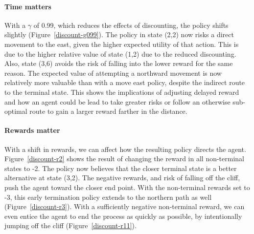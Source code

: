 \documentclass{sig-alternate}
\begin{document}
\paragraph{Time matters}

With a $\gamma$ of 0.99, which reduces the effects of discounting, the policy shifts slightly (Figure~\ref{discount-g099}). The policy in state (2,2) now risks a direct movement to the east, given the higher expected utility of that action. This is due to the higher relative value of state (1,2) due to the reduced discounting. Also, state (3,6) avoids the risk of falling into the lower reward for the same reason. The expected value of attempting a northward movement is now relatively more valuable than with a move east policy, despite the indirect route to the terminal state. This shows the implications of adjusting delayed reward and how an agent could be lead to take greater risks or follow an otherwise sub-optimal route to gain a larger reward farther in the distance.

\paragraph{Rewards matter}

With a shift in rewards, we can affect how the resulting policy directs the agent. Figure~\ref{discount-r2} shows the result of changing the reward in all non-terminal states to -2. The policy now believes that the closer terminal state is a better alternative at state (3,2). The negative rewards, and risk of falling off the cliff, push the agent toward the closer end point. With the non-terminal rewards set to -3, this early termination policy extends to the northern path as well (Figure~\ref{discount-r3}). With a sufficiently negative non-terminal reward, we can even entice the agent to end the process as quickly as possible, by intentionally jumping off the cliff (Figure~\ref{discount-r11}).
\end{document}
